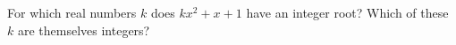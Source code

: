 For which real numbers $k$ does $kx^2+x+1$ have an integer root? Which of these $k$ are themselves integers?
